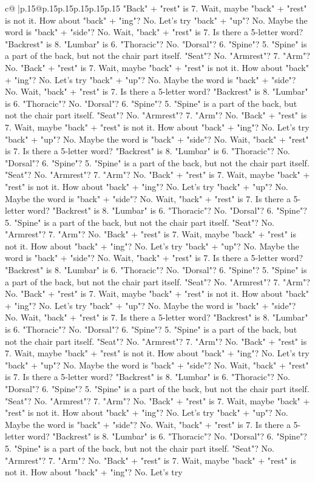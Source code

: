 \documentclass{article}
\begin{document}
{\begin{supertabular}{c@{$\;$}|p{.15\linewidth}@{}p{.15\linewidth}p{.15\linewidth}p{.15\linewidth}p{.15\linewidth}p{.15\linewidth}}
{{{"Back" + "rest" is 7. Wait, maybe "back" + "rest" is not it. How about "back" + "ing"? No. Let's try "back" + "up"? No. Maybe the word is "back" + "side"? No. Wait, "back" + "rest" is 7. Is there a 5{-}letter word? "Backrest" is 8. "Lumbar" is 6. "Thoracic"? No. "Dorsal"? 6. "Spine"? 5. "Spine" is a part of the back, but not the chair part itself. "Seat"? No. "Armrest"? 7. "Arm"? No. "Back" + "rest" is 7. Wait, maybe "back" + "rest" is not it. How about "back" + "ing"? No. Let's try "back" + "up"? No. Maybe the word is "back" + "side"? No. Wait, "back" + "rest" is 7. Is there a 5{-}letter word? "Backrest" is 8. "Lumbar" is 6. "Thoracic"? No. "Dorsal"? 6. "Spine"? 5. "Spine" is a part of the back, but not the chair part itself. "Seat"? No. "Armrest"? 7. "Arm"? No. "Back" + "rest" is 7. Wait, maybe "back" + "rest" is not it. How about "back" + "ing"? No. Let's try "back" + "up"? No. Maybe the word is "back" + "side"? No. Wait, "back" + "rest" is 7. Is there a 5{-}letter word? "Backrest" is 8. "Lumbar" is 6. "Thoracic"? No. "Dorsal"? 6. "Spine"? 5. "Spine" is a part of the back, but not the chair part itself. "Seat"? No. "Armrest"? 7. "Arm"? No. "Back" + "rest" is 7. Wait, maybe "back" + "rest" is not it. How about "back" + "ing"? No. Let's try "back" + "up"? No. Maybe the word is "back" + "side"? No. Wait, "back" + "rest" is 7. Is there a 5{-}letter word? "Backrest" is 8. "Lumbar" is 6. "Thoracic"? No. "Dorsal"? 6. "Spine"? 5. "Spine" is a part of the back, but not the chair part itself. "Seat"? No. "Armrest"? 7. "Arm"? No. "Back" + "rest" is 7. Wait, maybe "back" + "rest" is not it. How about "back" + "ing"? No. Let's try "back" + "up"? No. Maybe the word is "back" + "side"? No. Wait, "back" + "rest" is 7. Is there a 5{-}letter word? "Backrest" is 8. "Lumbar" is 6. "Thoracic"? No. "Dorsal"? 6. "Spine"? 5. "Spine" is a part of the back, but not the chair part itself. "Seat"? No. "Armrest"? 7. "Arm"? No. "Back" + "rest" is 7. Wait, maybe "back" + "rest" is not it. How about "back" + "ing"? No. Let's try "back" + "up"? No. Maybe the word is "back" + "side"? No. Wait, "back" + "rest" is 7. Is there a 5{-}letter word? "Backrest" is 8. "Lumbar" is 6. "Thoracic"? No. "Dorsal"? 6. "Spine"? 5. "Spine" is a part of the back, but not the chair part itself. "Seat"? No. "Armrest"? 7. "Arm"? No. "Back" + "rest" is 7. Wait, maybe "back" + "rest" is not it. How about "back" + "ing"? No. Let's try "back" + "up"? No. Maybe the word is "back" + "side"? No. Wait, "back" + "rest" is 7. Is there a 5{-}letter word? "Backrest" is 8. "Lumbar" is 6. "Thoracic"? No. "Dorsal"? 6. "Spine"? 5. "Spine" is a part of the back, but not the chair part itself. "Seat"? No. "Armrest"? 7. "Arm"? No. "Back" + "rest" is 7. Wait, maybe "back" + "rest" is not it. How about "back" + "ing"? No. Let's try "back" + "up"? No. Maybe the word is "back" + "side"? No. Wait, "back" + "rest" is 7. Is there a 5{-}letter word? "Backrest" is 8. "Lumbar" is 6. "Thoracic"? No. "Dorsal"? 6. "Spine"? 5. "Spine" is a part of the back, but not the chair part itself. "Seat"? No. "Armrest"? 7. "Arm"? No. "Back" + "rest" is 7. Wait, maybe "back" + "rest" is not it. How about "back" + "ing"? No. Let's try }}}
\end{supertabular}}
\end{document}
